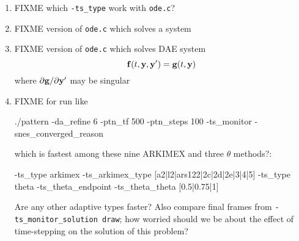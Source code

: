 \renewcommand{\labelenumi}{\arabic{chapter}.\arabic{enumi}\quad}
\renewcommand{\labelenumii}{(\alph{enumii})}
\begin{enumerate}
\item FIXME which \texttt{-ts\_type} work with \texttt{ode.c}?
\item FIXME version of \texttt{ode.c} which solves a system
\item FIXME version of \texttt{ode.c} which solves DAE system
    $$\mathbf{f}(t,\mathbf{y},\mathbf{y}') = \mathbf{g}(t,\mathbf{y})$$
where $\partial \mathbf{g}/\partial \mathbf{y}'$ may be singular
\item FIXME for run like
\begin{cline}
./pattern -da_refine 6 -ptn_tf 500 -ptn_steps 100 -ts_monitor -snes_converged_reason
\end{cline}
which is fastest among these nine ARKIMEX and three $\theta$ methods?:
\begin{code}
-ts_type arkimex -ts_arkimex_type [a2|l2|ars122|2c|2d|2e|3|4|5]
-ts_type theta -ts_theta_endpoint -ts_theta_theta [0.5|0.75|1]
\end{code}
Are any other adaptive \pTS types faster?  Also compare final frames from \texttt{-ts\_monitor\_solution draw}; how worried should we be about the effect of time-stepping on the solution of this problem?
\end{enumerate}
